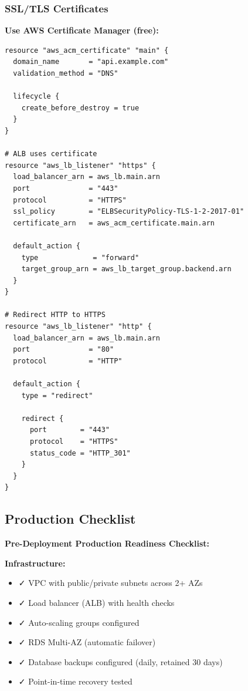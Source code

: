 \documentclass[12pt,a4paper,oneside]{article}
\begin{document}
{{\subsubsection{SSL/TLS Certificates}

\textbf{Use AWS Certificate Manager (free):}

\begin{lstlisting}[language=HCL, caption=Terraform: SSL Certificate]
resource "aws_acm_certificate" "main" {
  domain_name       = "api.example.com"
  validation_method = "DNS"
  
  lifecycle {
    create_before_destroy = true
  }
}

# ALB uses certificate
resource "aws_lb_listener" "https" {
  load_balancer_arn = aws_lb.main.arn
  port              = "443"
  protocol          = "HTTPS"
  ssl_policy        = "ELBSecurityPolicy-TLS-1-2-2017-01"
  certificate_arn   = aws_acm_certificate.main.arn
  
  default_action {
    type             = "forward"
    target_group_arn = aws_lb_target_group.backend.arn
  }
}

# Redirect HTTP to HTTPS
resource "aws_lb_listener" "http" {
  load_balancer_arn = aws_lb.main.arn
  port              = "80"
  protocol          = "HTTP"
  
  default_action {
    type = "redirect"
    
    redirect {
      port        = "443"
      protocol    = "HTTPS"
      status_code = "HTTP_301"
    }
  }
}
\end{lstlisting}

\subsection{Production Checklist}

\begin{importantbox}
\textbf{Pre-Deployment Production Readiness Checklist:}

\textbf{Infrastructure:}
\begin{itemize}
    \item ✓ VPC with public/private subnets across 2+ AZs
    \item ✓ Load balancer (ALB) with health checks
    \item ✓ Auto-scaling groups configured
    \item ✓ RDS Multi-AZ (automatic failover)
    \item ✓ Database backups configured (daily, retained 30 days)
    \item ✓ Point-in-time recovery tested
\end{itemize}


\end{importantbox}}}
\end{document}
